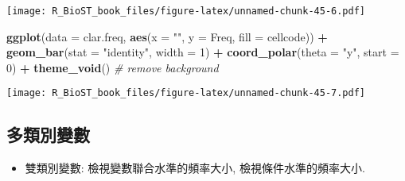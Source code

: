 \documentclass[
]{book}
\newenvironment{Shaded}{\begin{snugshade}}{\end{snugshade}}
\newcommand{\CommentTok}[1]{\textcolor[rgb]{0.56,0.35,0.01}{\textit{#1}}}
\newcommand{\DataTypeTok}[1]{\textcolor[rgb]{0.13,0.29,0.53}{#1}}
\newcommand{\DecValTok}[1]{\textcolor[rgb]{0.00,0.00,0.81}{#1}}
\newcommand{\KeywordTok}[1]{\textcolor[rgb]{0.13,0.29,0.53}{\textbf{#1}}}
\newcommand{\NormalTok}[1]{#1}
\newcommand{\OperatorTok}[1]{\textcolor[rgb]{0.81,0.36,0.00}{\textbf{#1}}}
\newcommand{\StringTok}[1]{\textcolor[rgb]{0.31,0.60,0.02}{#1}}
\providecommand{\tightlist}{%
  \setlength{\itemsep}{0pt}\setlength{\parskip}{0pt}}
\begin{document}
\texttt{[image: R\_BioST\_book\_files/figure-latex/unnamed-chunk-45-6.pdf]}

\begin{Shaded}
\begin{Highlighting}[]
\KeywordTok{ggplot}\NormalTok{(}\DataTypeTok{data =}\NormalTok{ clar.freq, }\KeywordTok{aes}\NormalTok{(}\DataTypeTok{x =} \StringTok{""}\NormalTok{, }\DataTypeTok{y =}\NormalTok{ Freq, }\DataTypeTok{fill =}\NormalTok{ cellcode)) }\OperatorTok{+}
\StringTok{  }\KeywordTok{geom\_bar}\NormalTok{(}\DataTypeTok{stat =} \StringTok{"identity"}\NormalTok{, }\DataTypeTok{width =} \DecValTok{1}\NormalTok{) }\OperatorTok{+}
\StringTok{  }\KeywordTok{coord\_polar}\NormalTok{(}\DataTypeTok{theta =} \StringTok{"y"}\NormalTok{, }\DataTypeTok{start =} \DecValTok{0}\NormalTok{) }\OperatorTok{+}
\StringTok{  }\KeywordTok{theme\_void}\NormalTok{() }\CommentTok{\# remove background}
\end{Highlighting}
\end{Shaded}

\texttt{[image: R\_BioST\_book\_files/figure-latex/unnamed-chunk-45-7.pdf]}

\hypertarget{ux591aux985eux5225ux8b8aux6578}{%
\subsection{多類別變數}\label{ux591aux985eux5225ux8b8aux6578}}

\begin{itemize}
\tightlist
\item
  雙類別變數: 檢視變數聯合水準的頻率大小,
  檢視條件水準的頻率大小.
\end{itemize}
\end{document}
